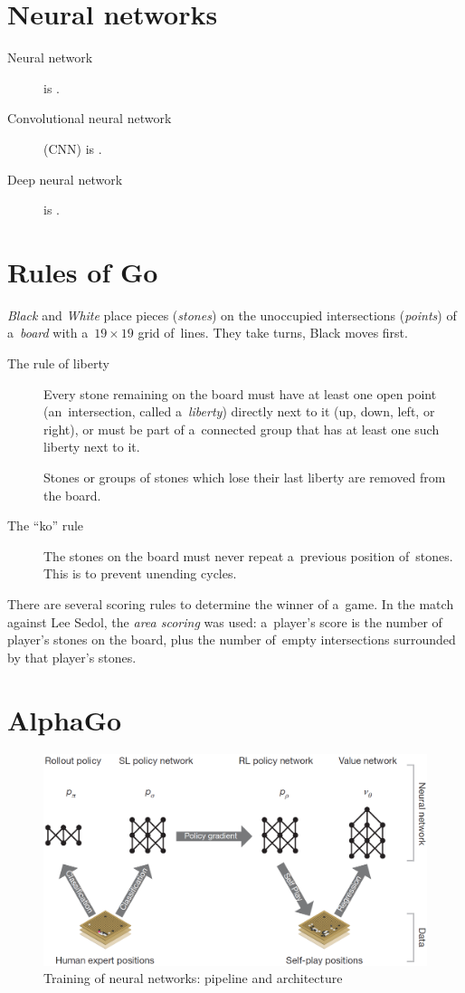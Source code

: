 \documentclass[a4paper,10pt]{article}
\begin{document}
\section{Neural networks}
\begin{description}
  \item [Neural network] is \todo.
  \item [Convolutional neural network] (CNN) is \todo.
  \item [Deep neural network] is \todo.
\end{description}

\section{Rules of Go}
\emph{Black} and \emph{White} place pieces (\emph{stones}) on the unoccupied intersections (\emph{points}) of a~\emph{board} with a~$19\times19$ grid of~lines.
They take turns, Black moves first.
\begin{description}
  \item [The rule of liberty]
    Every stone remaining on the board must have at least one open point (an~intersection, called a~\emph{liberty}) directly next to it (up, down, left, or right), or must be part of a~connected group that has at least one such liberty next to it.

    Stones or groups of stones which lose their last liberty are removed from the board.

  \item [The ``ko'' rule]
    The stones on the board must never repeat a~previous position of~stones.
    This is to prevent unending cycles.
\end{description}

There are several scoring rules to determine the winner of a~game.
In the match against Lee Sedol, the \emph{area scoring} was used:
a~player's score is the number of player's stones on the board, plus the number of~empty intersections surrounded by that player's stones.

\section{AlphaGo}
\begin{figure}[H]
  \centering
  \includegraphics[width=.7\textwidth]{../img/neural_nets_pipeline.png}
  \caption{Training of neural networks: pipeline and architecture}
  \label{fig:neural_nets_pipeline}
\end{figure}
\end{document}
